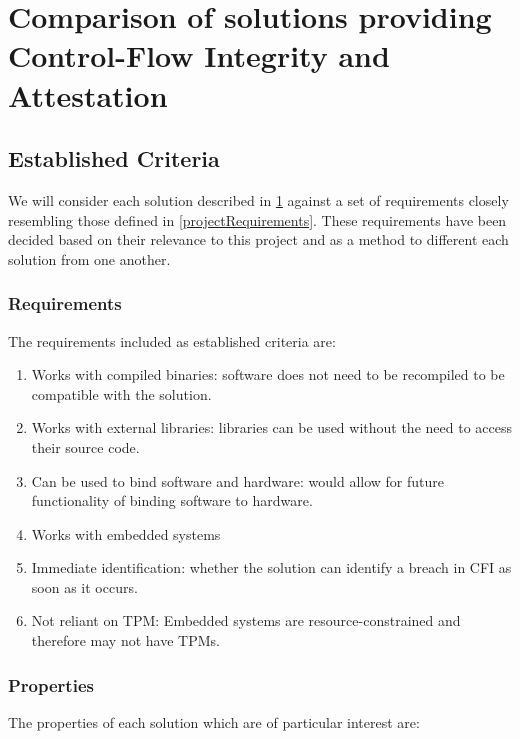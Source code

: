 \section{Comparison of solutions providing Control-Flow Integrity and Attestation} \label{comparisonOfCFISolutions}

\subsection{Established Criteria}\label{requirementsIntro}

We will consider each solution described in \ref{comparisonOfCFISolutions} against a set of requirements closely resembling those defined in \ref{projectRequirements}. These requirements have been decided based on their relevance to this project and as a method to different each solution from one another.

\subsubsection*{Requirements}\label{Requirements}

The requirements included as established criteria are:

\begin{enumerate}[label=(\arabic*),noitemsep]
	\item Works with compiled binaries: software does not need to be recompiled to be compatible with the solution.
	\item Works with external libraries: libraries can be used without the need to access their source code.
	\item Can be used to bind software and hardware: would allow for future functionality of binding software to hardware.
	\item Works with embedded systems
	\item Immediate identification: whether the solution can identify a breach in CFI as soon as it occurs.
	\item Not reliant on TPM: Embedded systems are resource-constrained and therefore may not have TPMs.
\end{enumerate}

\subsubsection*{Properties}\label{Properties}

The properties of each solution which are of particular interest are:

